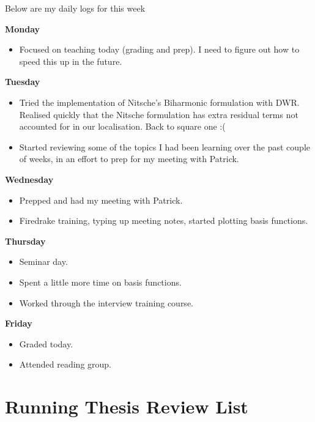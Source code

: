\documentclass[12pt,a4paper]{article}
\begin{document}
Below are my daily logs for this week
\newline



\textbf{Monday}

\begin{itemize}
    \item Focused on teaching today (grading and prep). I need to figure out how to speed this up in the future.
\end{itemize}

\textbf{Tuesday}

\begin{itemize}
\item Tried the implementation of Nitsche's Biharmonic formulation with DWR. Realised quickly that the Nitsche formulation has extra residual terms not accounted for in our localisation. Back to square one :(
\item Started reviewing some of the topics I had been learning over the past couple of weeks, in an effort to prep for my meeting with Patrick. 
\end{itemize}

\textbf{Wednesday}

\begin{itemize}
    \item Prepped and had my meeting with Patrick.
    \item Firedrake training, typing up meeting notes, started plotting basis functions. 
\end{itemize}

\textbf{Thursday}
\begin{itemize}
    \item Seminar day.
    \item Spent a little more time on basis functions. 
    \item Worked through the interview training course.
\end{itemize}

\textbf{Friday}

\begin{itemize}
    \item  Graded today.
    \item Attended reading group. 
\end{itemize}




\newpage

\section{Running Thesis Review List}
\end{document}
